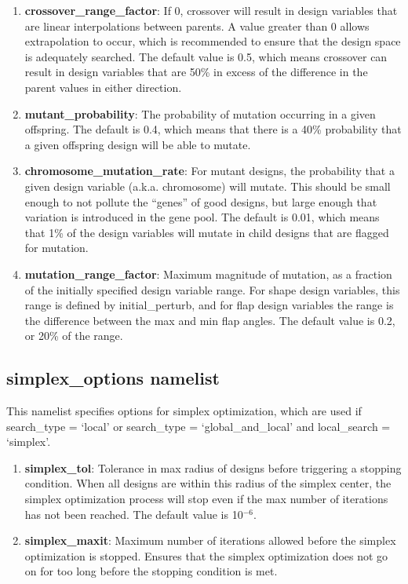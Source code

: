 \documentclass[11pt]{article}
\begin{document}
\begin{enumerate}
{repeated for each parent that is selected.)}
\item{\textbf{crossover\_range\_factor}: If 0, crossover will result in design variables
that are linear interpolations between parents.  A value greater than 0 allows
extrapolation to occur, which is recommended to ensure that the design space is adequately
searched.  The default value is 0.5, which means crossover can result in design variables
that are 50\% in excess of the difference in the parent values in either direction.}
\item{\textbf{mutant\_probability}: The probability of mutation occurring in a given
offspring.  The default is 0.4, which means that there is a 40\% probability that a given
offspring design will be able to mutate.}
\item{\textbf{chromosome\_mutation\_rate}: For mutant designs, the probability that a
given design variable (a.k.a. chromosome) will mutate. This should be small enough to not
pollute the ``genes'' of good designs, but large enough that variation is introduced in
the gene pool.  The default is 0.01, which means that 1\% of the design variables will
mutate in child designs that are flagged for mutation.}
\item{\textbf{mutation\_range\_factor}: Maximum magnitude of mutation, as a fraction of
the initially specified design variable range.  For shape design
variables, this range is defined by initial\_perturb, and for flap design variables the
range is the difference between the max and min flap angles.  The default value is 0.2, or
20\% of the range.}
\end{enumerate}

\subsection{simplex\_options namelist}

This namelist specifies options for simplex optimization, which are used if
search\_type = `local' or search\_type = `global\_and\_local' and local\_search =
`simplex'.

\begin{enumerate}
\item{\textbf{simplex\_tol}: Tolerance in max radius of designs before triggering a
stopping condition.  When all designs are within this radius of the simplex center, the
simplex optimization process will stop even if the max number of iterations has not been
reached.  The default value is 10$^{-6}$.}
\item{\textbf{simplex\_maxit}: Maximum number of iterations allowed before the simplex
optimization is stopped.  Ensures that the simplex optimization does not go on for
too long before the stopping condition is met.}
\end{enumerate}
\end{document}
